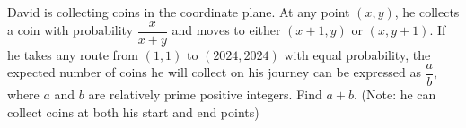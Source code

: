 David is collecting coins in the coordinate plane. At any point $(x,y)$, he collects a coin with probability $\dfrac{x}{x+y}$ and moves to either $(x+1,y)$ or $(x,y+1)$. If he takes any route from $(1,1)$ to $(2024, 2024)$ with equal probability, the expected number of coins he will collect on his journey can be expressed as $\dfrac{a}{b}$, where $a$ and $b$ are relatively prime positive integers. Find $a+b$. (Note: he can collect coins at both his start and end points)
